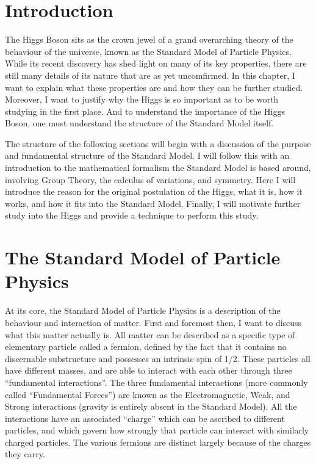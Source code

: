 \section{Introduction}

    The Higgs Boson sits as the crown jewel of a grand overarching theory of the behaviour of the universe,
        known as the Standard Model of Particle Physics.
    While its recent discovery has shed light on many of its key properties,
        there are still many details of its nature that are as yet uncomfirmed.
    In this chapter, I want to explain what these properties are and how they can be further studied.
    Moreover, I want to justify why the Higgs is so important as to be worth studying in the first place.
    And to understand the importance of the Higgs Boson, one must understand the structure of the Standard Model itself.

    The structure of the following sections will begin with a discussion of the purpose and fundamental structure of the Standard Model.
    I will follow this with an introduction to the mathematical formalism the Standard Model is based around,
        involving Group Theory, the calculus of variations, and symmetry.
    Here I will introduce the reason for the original postulation of the Higgs, what it is, how it works, and how it fits into the Standard Model.
    Finally, I will motivate further study into the Higgs and provide a technique to perform this study.


\section{The Standard Model of Particle Physics}
    
    At its core, the Standard Model of Particle Physics is a description of the behaviour and interaction of matter.
    First and foremost then, I want to discuss what this matter actually is.
    All matter can be described as a specific type of elementary particle called a fermion,
        defined by the fact that it contains no discernable substructure and possesses an intrinsic spin of 1/2.
    These particles all have different masses, and are able to interact with each other through three ``fundamental interactions''.
    The three fundamental interactions (more commonly called ``Fundamental Forces'') are known as
        the Electromagnetic, Weak, and Strong interactions (gravity is entirely absent in the Standard Model).
    All the interactions have an associated ``charge'' which can be ascribed to different particles,
        and which govern how strongly that particle can interact with similarly charged particles.
    The various fermions are distinct largely because of the charges they carry.

